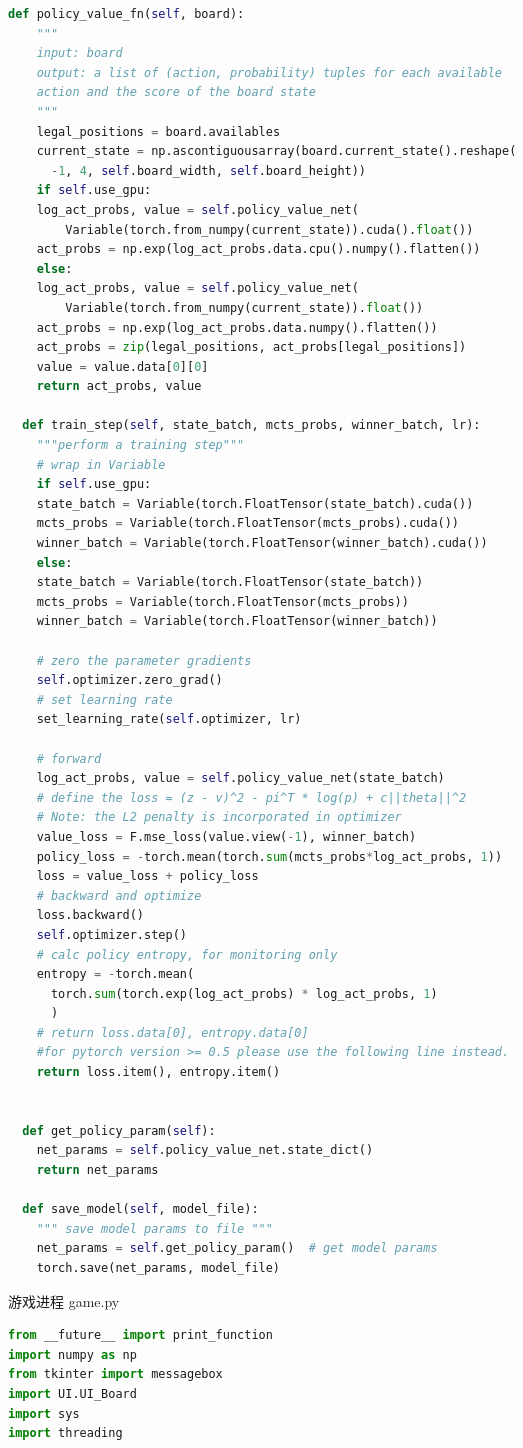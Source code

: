 \documentclass[a4paper]{article}
\begin{document}
\begin{multicols}{2}
\begin{lstlisting}[language=Python,breaklines = true,columns=flexible]
  def policy_value_fn(self, board):
    """
    input: board
    output: a list of (action, probability) tuples for each available
    action and the score of the board state
    """
    legal_positions = board.availables
    current_state = np.ascontiguousarray(board.current_state().reshape(
      -1, 4, self.board_width, self.board_height))
    if self.use_gpu:
    log_act_probs, value = self.policy_value_net(
        Variable(torch.from_numpy(current_state)).cuda().float())
    act_probs = np.exp(log_act_probs.data.cpu().numpy().flatten())
    else:
    log_act_probs, value = self.policy_value_net(
        Variable(torch.from_numpy(current_state)).float())
    act_probs = np.exp(log_act_probs.data.numpy().flatten())
    act_probs = zip(legal_positions, act_probs[legal_positions])
    value = value.data[0][0]
    return act_probs, value

  def train_step(self, state_batch, mcts_probs, winner_batch, lr):
    """perform a training step"""
    # wrap in Variable
    if self.use_gpu:
    state_batch = Variable(torch.FloatTensor(state_batch).cuda())
    mcts_probs = Variable(torch.FloatTensor(mcts_probs).cuda())
    winner_batch = Variable(torch.FloatTensor(winner_batch).cuda())
    else:
    state_batch = Variable(torch.FloatTensor(state_batch))
    mcts_probs = Variable(torch.FloatTensor(mcts_probs))
    winner_batch = Variable(torch.FloatTensor(winner_batch))

    # zero the parameter gradients
    self.optimizer.zero_grad()
    # set learning rate
    set_learning_rate(self.optimizer, lr)

    # forward
    log_act_probs, value = self.policy_value_net(state_batch)
    # define the loss = (z - v)^2 - pi^T * log(p) + c||theta||^2
    # Note: the L2 penalty is incorporated in optimizer
    value_loss = F.mse_loss(value.view(-1), winner_batch)
    policy_loss = -torch.mean(torch.sum(mcts_probs*log_act_probs, 1))
    loss = value_loss + policy_loss
    # backward and optimize
    loss.backward()
    self.optimizer.step()
    # calc policy entropy, for monitoring only
    entropy = -torch.mean(
      torch.sum(torch.exp(log_act_probs) * log_act_probs, 1)
      )
    # return loss.data[0], entropy.data[0]
    #for pytorch version >= 0.5 please use the following line instead.
    return loss.item(), entropy.item()


  def get_policy_param(self):
    net_params = self.policy_value_net.state_dict()
    return net_params

  def save_model(self, model_file):
    """ save model params to file """
    net_params = self.get_policy_param()  # get model params
    torch.save(net_params, model_file)
  \end{lstlisting}
  游戏进程
  game.py
  \begin{lstlisting}[language=Python,breaklines = true,columns=flexible]
from __future__ import print_function
import numpy as np
from tkinter import messagebox
import UI.UI_Board
import sys
import threading




\end{lstlisting}
\end{multicols}
\end{document}
